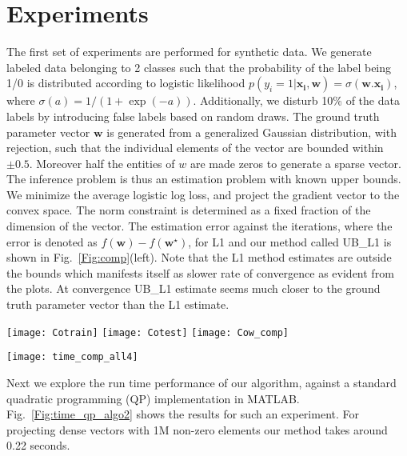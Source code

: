 \documentclass{article}
\begin{document}
\section{Experiments}\label{SEC:Expts}
The first set of experiments are performed for synthetic data. We generate labeled data belonging to 2 classes such that the probability of the label being 1/0 is distributed according to logistic likelihood $p(y_i=1|\mathbf{x_i,w})=\sigma(\mathbf{w.x_i})$,
where $\sigma(a) = 1/(1+\exp(-a))$. Additionally, we disturb 10\% of the data labels by introducing false labels based on random draws.
The ground truth parameter vector $\mathbf{w}$ is generated from a generalized Gaussian distribution, with rejection, such that the individual elements of the vector are bounded within $\pm 0.5$. Moreover half the entities of $w$ are made zeros to generate a sparse vector. The inference problem is thus an estimation problem with known upper bounds. We minimize the average logistic log loss, and project the gradient vector to the convex space. The norm constraint is determined as a fixed fraction of the dimension of the vector. The estimation error against the iterations, where the error is denoted as $f(\mathbf{w}) - f(\mathbf{w}^\star)$, for L1 and our method called UB\_L1 is shown in Fig.~\ref{Fig:comp}(left). Note that the L1 method estimates are outside the bounds which manifests itself as slower rate of convergence as evident from the plots. At convergence UB\_L1 estimate seems much closer to the ground truth parameter vector than the L1 estimate.
\begin{figure*}[htbp!]
\centering
  \texttt{[image: Cotrain]}
  \texttt{[image: Cotest]}
  \texttt{[image: Cow\_comp]}
\caption{Top left: plot for abs$(f(\mathbf{w}) - f(\mathbf{w}^\star))$ vs. iteration (training). Top right: similar plot for testing. Bottom: estimated parameter vector $\mathbf{w}$. For all panels, blue: L1, red: our method UB\_L1 and green: ground truth. \label{Fig:comp}
}
\end{figure*}

\begin{figure*}[htbp!]
\centering
\texttt{[image: time\_comp\_all4]}
\caption{Left: comparison of our method against Matlab QP. Blue: run time (in seconds) for QP implementation of MATLAB. Red: run time for our linear time method. The horizontal axis runs over the dimension of the input vector $v$. Right: zoomed in red curve. \label{Fig:time_qp_algo2}
}
\end{figure*}
Next we explore the run time performance of our algorithm, against a standard quadratic programming (QP) implementation in MATLAB. Fig.~\ref{Fig:time_qp_algo2} shows the results for such an experiment. For projecting dense vectors with 1M non-zero
elements our method takes around 0.22 seconds.
\end{document}
